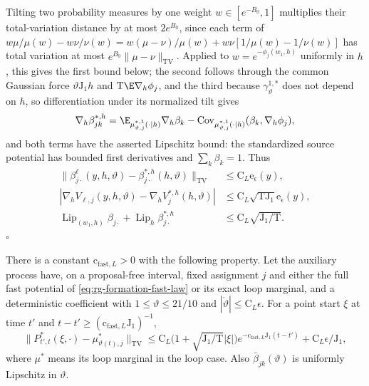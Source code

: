 Tilting two probability measures by one weight \(w\in[e^{-B_0},1]\) multiplies
their total-variation distance by at most \(2e^{B_0}\), since each term of
\(w\mu/\mu(w)-w\nu/\nu(w)=w(\mu-\nu)/\mu(w)+w\nu[1/\mu(w)-1/\nu(w)]\) has
total variation at most \(e^{B_0}\|\mu-\nu\|_{\mathrm{TV}}\). Applied to
\(w=e^{-\phi_j(w_1,h)}\) uniformly in \(h\), this gives the first bound below;
the second follows through the common Gaussian force
\(\vartheta\mathrm J_1h\) and \(\mathrm T\E\nabla_h\phi_j\), and the third
because \(\gamma^{1,*}_\vartheta\) does not depend on \(h\), so differentiation
under its normalized tilt gives
\[
\nabla_h\beta^{*,h}_{jk}
=\E_{\mu^{*,1}_{\vartheta,j}(\cdot\mid h)}\nabla_h\beta_k
-\operatorname{Cov}_{\mu^{*,1}_{\vartheta,j}(\cdot\mid h)}
 (\beta_k,\nabla_h\phi_j),
\]
and both terms have the asserted Lipschitz bound: the standardized source
potential has bounded first derivatives and \(\sum_k\beta_k=1\). Thus
\begin{align}
 \|\beta_{j\cdot}^\ell(y,h,\vartheta)
          -\beta_{j\cdot}^{*,h}(h,\vartheta)\|_{\mathrm{TV}}
 &\le \mathrm C_L\mathrm e_\epsilon(y),
 \label{eq:rg-formation-parent-row-environment}\\
 |\nabla_hV_{\ell,j}(y,h,\vartheta)
           -\nabla_hV_j^{*,h}(h,\vartheta)|
 &\le \mathrm C_L\sqrt{\mathrm T\mathrm J_1} \mathrm e_\epsilon(y),
 \label{eq:rg-formation-parent-force-environment}\\
 \operatorname{Lip}_{(w_1,h)}\beta_{j\cdot}
       +\operatorname{Lip}_h\beta_{j\cdot}^{*,h}
 &\le \mathrm C_L\sqrt{\mathrm J_1/\mathrm T}.
 \label{eq:rg-formation-row-fast-lipschitz}
\end{align}
\hfill\(\square\)

There is a constant \(\mathrm c_{\mathrm{fast},L}>0\) with the following property.
Let the auxiliary process have, on a proposal-free interval, fixed assignment
\(j\) and either the full fast potential of \cref{eq:rg-formation-fast-law} or
its exact loop marginal, and a deterministic coefficient with
\(1\le\vartheta\le21/10\) and \(|\dot\vartheta|\le\mathrm C_L\epsilon\). For a
point start \(\xi\) at time \(t'\) and \(t-t'\ge(\mathrm c_{\mathrm{fast},L}\mathrm J_1)^{-1}\),
\begin{equation}
 \|P^*_{t',t}(\xi,\cdot)-\mu^*_{\vartheta(t),j}\|_{\mathrm{TV}}
 \le \mathrm C_L\bigl(1+\sqrt{\mathrm J_1/\mathrm T}|\xi|\bigr)
              e^{-\mathrm c_{\mathrm{fast},L}\mathrm J_1(t-t')}
       +\mathrm C_L\epsilon/\mathrm J_1,
 \label{eq:rg-formation-fast-mixing-bound}
\end{equation}
where \(\mu^*\) means its loop marginal in the loop case. Also
\(\bar\beta_{jk}(\vartheta)\) is uniformly Lipschitz in \(\vartheta\).

